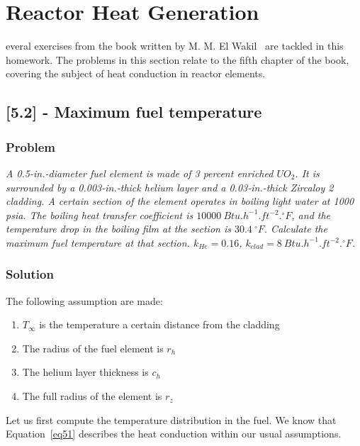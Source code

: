 %
%
\let\textcircled=\pgftextcircled
\chapter{Reactor Heat Generation}
\label{chap:intro}

everal exercises from the book written by M. M. El Wakil~\cite{book01} are tackled in this homework. The problems in this section relate to the fifth chapter of the book, covering the subject of heat conduction in reactor elements.

\section{[5.2] - Maximum fuel temperature}
\label{prob51}

\subsection{Problem}
\textit{A 0.5-in.-diameter fuel element is made of 3 percent enriched $UO_2$. It is surrounded by a 0.003-in.-thick helium layer and a 0.03-in.-thick Zircaloy 2 cladding. A certain section of the element operates in boiling light water at 1000 psia. The boiling heat transfer coefficient is $10000\ Btu.h^{-1}.ft^{-2}.{}^\circ F$, and the temperature drop in the boiling film at the section is $30.4\ {}^\circ F$. Calculate the maximum fuel temperature at that section. $k_{He}=0.16$, $k_{clad} = 8\ Btu.h^{-1}.ft^{-2}.^\circ F$.}

\subsection{Solution}


The following assumption are made:

\begin{enumerate}
\item $T_{\infty}$ is the temperature a certain distance from the cladding
\item The radius of the fuel element is $r_h$
\item The helium layer thickness is $c_h$
\item The full radius of the element is $r_z$
\end{enumerate}

Let us first compute the temperature distribution in the fuel. We know that Equation~\ref{eq51} describes the heat conduction within our usual assumptions.

